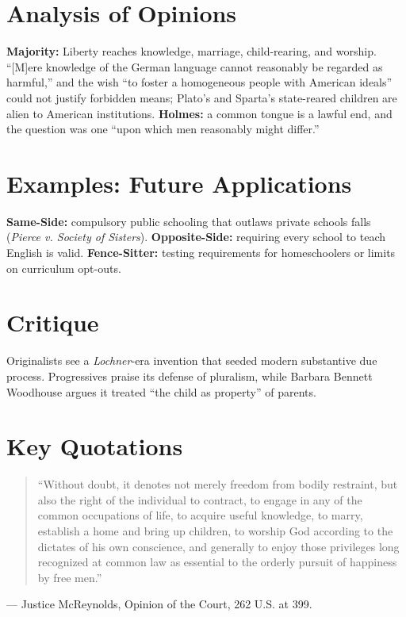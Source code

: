 \documentclass[12pt]{article}
\begin{document}
\section{Analysis of Opinions}
\textbf{Majority:} Liberty reaches knowledge, marriage, child-rearing, and worship. ``[M]ere knowledge of the German language cannot reasonably be regarded as harmful,'' and the wish ``to foster a homogeneous people with American ideals'' could not justify forbidden means; Plato's and Sparta's state-reared children are alien to American institutions. \textbf{Holmes:} a common tongue is a lawful end, and the question was one ``upon which men reasonably might differ.''

\section{Examples: Future Applications}
\textbf{Same-Side:} compulsory public schooling that outlaws private schools falls (\textit{Pierce v. Society of Sisters}). \textbf{Opposite-Side:} requiring every school to teach English is valid. \textbf{Fence-Sitter:} testing requirements for homeschoolers or limits on curriculum opt-outs.

\section{Critique}
Originalists see a \textit{Lochner}-era invention that seeded modern substantive due process. Progressives praise its defense of pluralism, while Barbara Bennett Woodhouse argues it treated ``the child as property'' of parents.

\section{Key Quotations}
\begin{quote}
``Without doubt, it denotes not merely freedom from bodily restraint, but also the right of the individual to contract, to engage in any of the common occupations of life, to acquire useful knowledge, to marry, establish a home and bring up children, to worship God according to the dictates of his own conscience, and generally to enjoy those privileges long recognized at common law as essential to the orderly pursuit of happiness by free men.''
\end{quote}
\noindent --- Justice McReynolds, Opinion of the Court, 262 U.S. at 399.
\end{document}
